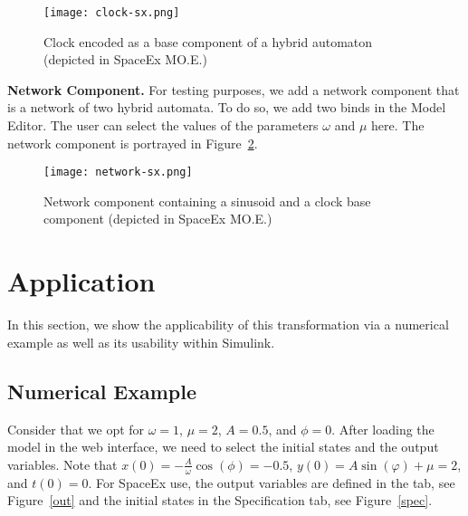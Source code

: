 \documentclass{article}
\begin{document}
\begin{figure}[ht!]
\centering
\texttt{[image: clock-sx.png]}
\caption{Clock encoded as a base component of a hybrid automaton (depicted in SpaceEx MO.E.)}
\label{clock}
\end{figure}
%
\noindent \textbf{Network Component.} For testing purposes, we add a network component that is a network of two hybrid automata. To do so, we add two binds in the Model Editor. The user can select the values of the parameters $\omega$ and $\mu$ here. The network component is portrayed in Figure~\ref{network}.%

\begin{figure}[ht!]
\centering
\texttt{[image: network-sx.png]}
\caption{Network component containing a sinusoid and a clock base component  (depicted in SpaceEx MO.E.)}
\label{network}
\end{figure}


\section{Application}

In this section, we show the applicability of this transformation via a numerical example as well as its usability within Simulink.
\subsection{Numerical Example}

Consider that we opt for $\omega=1$, $\mu=2$, $A=0.5$, and $\phi=0$. After loading the model in the web interface, we need to select the initial states and the output variables. Note that $x(0)=-\frac{A}{\omega}\cos(\phi)=-0.5$, $y(0)=A\sin(\varphi) + \mu=2$, and $t(0)=0$. For SpaceEx use, the output variables are defined in the {} tab, see Figure~\ref{out} and the initial states in the {\sf Specification} tab, see Figure~\ref{spec}.
\end{document}
